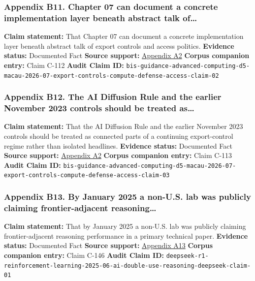 \documentclass[
  american,
  11pt,
  letterpaper,
]{article}
\begin{document}
\subsubsection{Appendix B11. Chapter 07 can document a concrete
implementation layer beneath abstract talk
of\ldots{}}\label{appendix-b11-chapter-07-can-document-a-concrete-implementation-layer-beneath-abstract-talk-of}

\textbf{Claim statement:} That Chapter 07 can document a concrete
implementation layer beneath abstract talk of export controls and access
politics. \textbf{Evidence status:} Documented Fact \textbf{Source
support:}
\hyperref[appendix-a2-guidance-regarding-enforcement-of-license-requirements-for-advanced-computing-items-for-entities-headquartered-in-country-group-d-5-and-macau]{Appendix
A2} \textbf{Corpus companion entry:} Claim C-112 \textbf{Audit Claim
ID:}
\texttt{bis-guidance-advanced-computing-d5-macau-2026-07-export-controls-compute-defense-access-claim-02}

\subsubsection{Appendix B12. The AI Diffusion Rule and the earlier
November 2023 controls should be treated
as\ldots{}}\label{appendix-b12-the-ai-diffusion-rule-and-the-earlier-november-2023-controls-should-be-treated-as}

\textbf{Claim statement:} That the AI Diffusion Rule and the earlier
November 2023 controls should be treated as connected parts of a
continuing export-control regime rather than isolated headlines.
\textbf{Evidence status:} Documented Fact \textbf{Source support:}
\hyperref[appendix-a2-guidance-regarding-enforcement-of-license-requirements-for-advanced-computing-items-for-entities-headquartered-in-country-group-d-5-and-macau]{Appendix
A2} \textbf{Corpus companion entry:} Claim C-113 \textbf{Audit Claim
ID:}
\texttt{bis-guidance-advanced-computing-d5-macau-2026-07-export-controls-compute-defense-access-claim-03}

\subsubsection{Appendix B13. By January 2025 a non-U.S. lab was publicly
claiming frontier-adjacent
reasoning\ldots{}}\label{appendix-b13-by-january-2025-a-non-u-s-lab-was-publicly-claiming-frontier-adjacent-reasoning}

\textbf{Claim statement:} That by January 2025 a non-U.S. lab was
publicly claiming frontier-adjacent reasoning performance in a primary
technical paper. \textbf{Evidence status:} Documented Fact
\textbf{Source support:}
\hyperref[appendix-a13-deepseek-r1-incentivizing-reasoning-capability-in-llms-via-reinforcement-learning]{Appendix
A13} \textbf{Corpus companion entry:} Claim C-146 \textbf{Audit Claim
ID:}
\texttt{deepseek-r1-reinforcement-learning-2025-06-ai-double-use-reasoning-deepseek-claim-01}
\end{document}
